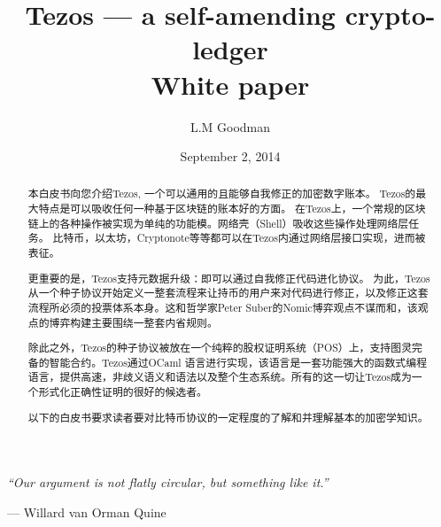 \documentclass[letterpaper]{article}
\author{L.M Goodman}
\date{September 2, 2014}
\title{Tezos --- a self-amending crypto-ledger \\ White paper}
\begin{document}
\maketitle

\epigraph{\emph{``Our argument is not flatly circular,
but something like it.''}}
{--- \textup{Willard van Orman Quine}}


\begin{abstract}
本白皮书向您介绍Tezos, 一个可以通用的且能够自我修正的加密数字账本。
Tezos的最大特点是可以吸收任何一种基于区块链的账本好的方面。 
在Tezos上，一个常规的区块链上的各种操作被实现为单纯的功能模。网络壳（Shell）吸收这些操作处理网络层任务。
比特币，以太坊，Cryptonote等等都可以在Tezos内通过网络层接口实现，进而被表征。


更重要的是，Tezos支持元数据升级：即可以通过自我修正代码进化协议。
为此，Tezos从一个种子协议开始定义一整套流程来让持币的用户来对代码进行修正，以及修正这套流程所必须的投票体系本身。这和哲学家Peter Suber的Nomic\cite{Nomic}博弈观点不谋而和，该观点的博弈构建主要围绕一整套内省规则。

除此之外，Tezos的种子协议被放在一个纯粹的股权证明系统（POS）上，支持图灵完备的智能合约。Tezos通过OCaml 语言进行实现，该语言是一套功能强大的函数式编程语言，提供高速，非歧义语义和语法以及整个生态系统。所有的这一切让Tezos成为一个形式化正确性证明的很好的候选者。

以下的白皮书要求读者要对比特币协议的一定程度的了解和并理解基本的加密学知识。

\end{abstract}
\newpage
\end{document}
